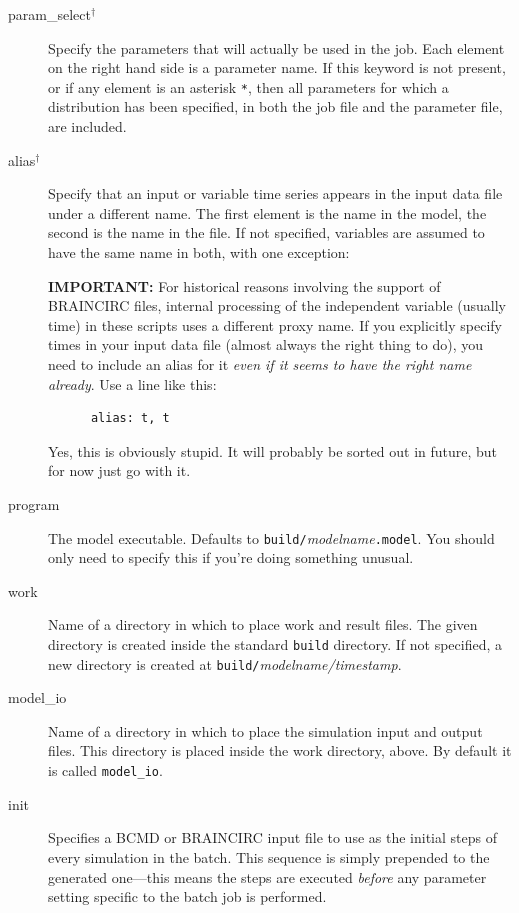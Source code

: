 \documentclass[a4paper,11pt]{article}
\begin{document}
\begin{adjustwidth}{0.8cm}{0.8cm}
\begin{description}
\item[param\_select$^{\dagger}$] Specify the parameters that will actually be used in the job. Each element on the right hand side is a parameter name. If this keyword is not present, or if any element is an asterisk \texttt{*}, then all parameters for which a distribution has been specified, in both the job file and the parameter file, are included.
\item[alias$^{\dagger}$] Specify that an input or variable time series appears in the input data file under a different name. The first element is the name in the model, the second is the name in the file. If not specified, variables are assumed to have the same name in both, with one exception:

\textbf{IMPORTANT:} For historical reasons involving the support of BRAINCIRC files, internal processing of the independent variable (usually time) in these scripts uses a different proxy name. If you explicitly specify times in your input data file (almost always the right thing to do), you need to include an alias for it \textit{even if it seems to have the right name already}. Use a line like this:
\begin{verbatim}
      alias: t, t
\end{verbatim}
Yes, this is obviously stupid. It will probably be sorted out in future, but for now just go with it.
\item[program] The model executable. Defaults to \texttt{build/}\textit{modelname}\texttt{.model}. You should only need to specify this if you're doing something unusual.
\item[work] Name of a directory in which to place work and result files. The given directory is created inside the standard \texttt{build} directory. If not specified, a new directory is created at \texttt{build/}\textit{modelname/timestamp}.
\item[model\_io] Name of a directory in which to place the simulation input and output files. This directory is placed inside the work directory, above. By default it is called \texttt{model\_io}.
\item[init] Specifies a BCMD or BRAINCIRC input file to use as the initial steps of every simulation in the batch. This sequence is simply prepended to the generated one---this means the steps are executed \textit{before} any parameter setting specific to the batch job is performed.
\end{description}
\end{adjustwidth}
\end{document}
